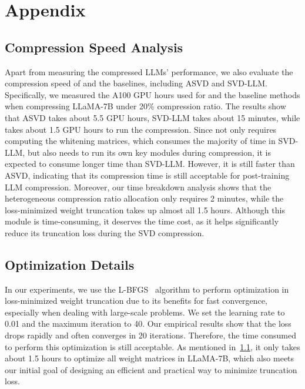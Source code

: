 \section{Appendix}
\label{sec:appendix}
\subsection{Compression Speed Analysis}
\label{appendix:compression_speed_analysis}
Apart from measuring the compressed LLMs' performance, we also evaluate the compression speed of \sysname and the baselines, including ASVD and SVD-LLM. Specifically, we measured the A100 GPU hours used for \sysname and the baseline methods when compressing LLaMA-7B under 20\% compression ratio. The results show that ASVD takes about 5.5 GPU hours, SVD-LLM takes about 15 minutes, while \sysname takes about 1.5 GPU hours to run the compression. Since \sysname not only requires computing the whitening matrices, which consumes the majority of time in SVD-LLM, but also needs to run its own key modules during compression, it is expected to consume longer time than SVD-LLM. However, it is still faster than ASVD, indicating that its compression time is still acceptable for post-training LLM compression. Moreover, our time breakdown analysis shows that the heterogeneous compression ratio allocation only requires 2 minutes, while the loss-minimized weight truncation takes up almost all 1.5 hours. Although this module is time-consuming, it deserves the time cost, as it helps \sysname significantly reduce its truncation loss during the SVD compression.

\subsection{Optimization Details}
\label{appendix:optimization_details}
In our experiments, we use the L-BFGS~\citep{Nash1991ANS} algorithm to perform optimization in loss-minimized weight truncation due to its benefits for fast convergence, especially when dealing with large-scale problems. We set the learning rate to 0.01 and the maximum iteration to 40. Our empirical results show that the loss drops rapidly and often converges in 20 iterations. Therefore, the time consumed to perform this optimization is still acceptable. As mentioned in~\cref{appendix:compression_speed_analysis}, it only takes about 1.5 hours to optimize all weight matrices in LLaMA-7B, which also meets our initial goal of designing an efficient and practical way to minimize truncation loss.

